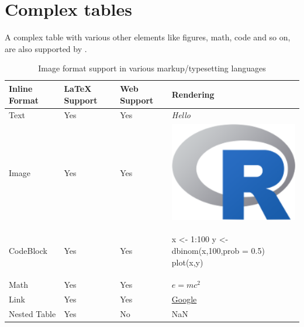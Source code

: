 \section{Complex tables}
A complex table with various other elements like figures, math, code and so on, are also supported
by .  
\begin{table}[htbp]
\centering
\begin{tabular}{|l | lll |}
 \hline
 Inline Format & LaTeX Support & Web Support &  Rendering \\
 \hline
 Text       & Yes & Yes  & \emph{Hello} \\ \hline
 Image       & Yes & Yes & \begin{minipage}{0.25\textwidth}
    \centering
    \includegraphics[width=1\textwidth]{R.png}
    \end{minipage} \\ \hline
 CodeBlock      & Yes & Yes & \begin{minipage}{0.45\textwidth}
\vspace{1mm}
\begin{example}
x <- 1:100
y <- dbinom(x,100,prob = 0.5)
plot(x,y)
\end{example}
    \end{minipage} \\ \hline
 Math      & Yes & Yes & $e = m c^2 $ \\ \hline
 Link      & Yes & Yes &  \href{www.google.com}{Google} \\ \hline
 Nested Table & Yes & No & NaN \\
\hline
\end{tabular}
\caption{Image format support in various markup/typesetting languages}
\label{table:3}
\end{table}


